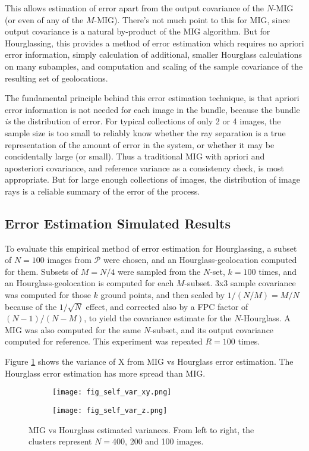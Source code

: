 \documentclass[10pt]{amsart}
\newcommand{\Pimg}{\mathcal{P}}
\begin{document}
This allows estimation of error apart from the output covariance of the $N$-MIG
(or even of any of the $M$-MIG). There's not much point to this for MIG, since
output covariance is a natural by-product of the MIG algorithm. But for
Hourglassing, this provides a method of error estimation which requires no
apriori error information, simply calculation of additional, smaller Hourglass
calculations on many subamples, and computation and scaling of the sample
covariance of the resulting set of geolocations.

The fundamental principle behind this error estimation technique, is that
apriori error information is not needed for each image in the bundle, because
the bundle {\em is} the distribution of error. For typical collections of only 2
or 4 images, the sample size is too small to reliably know whether the ray
separation is a true representation of the amount of error in the system, or
whether it may be concidentally large (or small). Thus a traditional MIG with
apriori and aposteriori covariance, and reference variance as a consistency
check, is most appropriate. But for large enough collections of images, the
distribution of image rays is a reliable summary of the error of the process.

\subsection{\label{hsimulation}Error Estimation Simulated Results}
To evaluate this empirical method of error estimation for Hourglassing, a subset
of $N=100$ images from $\Pimg$ were chosen, and an Hourglass-geolocation
computed for them. Subsets of $M=N/4$ were sampled from the $N$-set, $k=100$
times, and an Hourglass-geolocation is computed for each $M$-subset. 3x3 sample
covariance was computed for those $k$ ground points, and then scaled by
$1/(N/M)=M/N$ because of the $1/\sqrt{N}$ effect, and corrected also by a FPC
factor of $(N-1)/(N-M)$, to yield the covariance estimate for the
$N$-Hourglass. A MIG was also computed for the same $N$-subset, and its output
covariance computed for reference. This experiment was repeated $R=100$ times.

Figure \ref{fig:mig_vs_hourglass_var} shows the variance of X from MIG vs
Hourglass error estimation. The Hourglass error estimation has more spread than MIG.

\begin{figure}
\centering
\begin{subfigure}{.5\textwidth}
  \centering
  \texttt{[image: fig\_self\_var\_xy.png]}
\end{subfigure}%
\begin{subfigure}{.5\textwidth}
  \centering
  \texttt{[image: fig\_self\_var\_z.png]}
\end{subfigure}
\caption{\label{fig:mig_vs_hourglass_var}MIG vs Hourglass estimated
  variances. From left to right, the clusters represent $N=$400, 200 and 100
  images.}
\end{figure}
\end{document}
